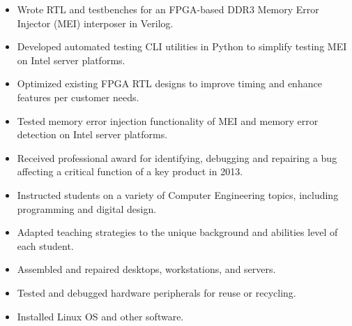 \documentclass{article}
\begin{document}
\vspace{3pt}


	\begin{itemize}\setlength{\itemsep}{-4pt}
		\item Wrote RTL and testbenches for an FPGA-based DDR3 Memory Error Injector (MEI) interposer in Verilog.
		\item Developed automated testing CLI utilities in Python to simplify testing MEI on Intel server platforms.
		\item Optimized existing FPGA RTL designs to improve timing and enhance features per customer needs.
		\item Tested memory error injection functionality of MEI and memory error detection on Intel server platforms.
		\item Received professional award for identifying, debugging and repairing a bug affecting a critical function of a key product in 2013.

	\end{itemize} 


	\begin{itemize}\setlength{\itemsep}{-4pt}
		\item Instructed students on a variety of Computer Engineering topics, including programming and digital design.
		\item Adapted teaching strategies to the unique background and abilities level of each student.
	\end{itemize}

	
	\begin{itemize} \setlength{\itemsep}{-4pt}
		\item Assembled and repaired desktops, workstations, and servers.
		\item Tested and debugged hardware peripherals for reuse or recycling.		
		\item Installed Linux OS and other software.
	\end{itemize}
	
	
\end{document}
